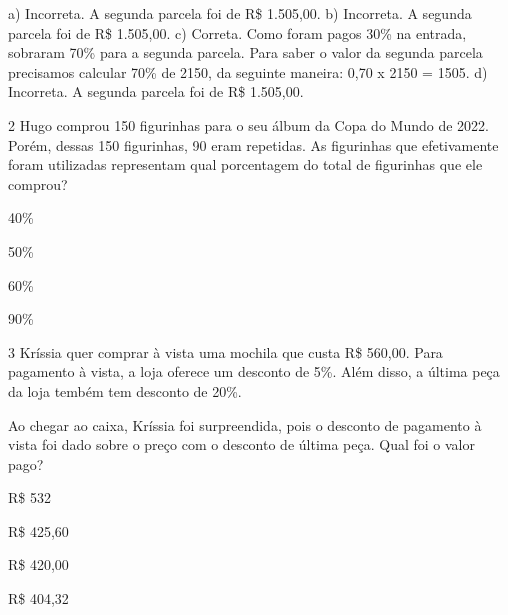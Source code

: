 \begin{escolha}
\begin{boxmedio}
\begin{boxmedio}
{\begin{boxpeq}
\begin{boxpeq}
{\begin{boxpeq}
\begin{boxmedio}
\begin{boxmedio}
\begin{boxpeq}
\begin{boxmedio}
\begin{boxpeq}
\begin{boxpeq}
\begin{boxpeq}
\begin{boxpeq}
{a) Incorreta. A segunda parcela foi de R\$ 1.505,00.
b) Incorreta. A segunda parcela foi de R\$ 1.505,00.
c) Correta. Como foram pagos 30\% na entrada, sobraram 70\% para a segunda 
parcela. Para saber o valor da segunda parcela precisamos calcular 70\% de
2150, da seguinte maneira: 0,70 x 2150 = 1505.
d) Incorreta. A segunda parcela foi de R\$ 1.505,00.}

\num{2} Hugo comprou 150 figurinhas para o seu álbum da Copa do Mundo de
2022. Porém, dessas 150 figurinhas, 90 eram repetidas. As figurinhas que
efetivamente foram utilizadas representam qual porcentagem do total de
figurinhas que ele comprou?

\begin{escolha}

\item 40\%
\item 50\%
\item 60\%
\item 90\%

\end{escolha}


\num{3} Kríssia quer comprar à vista uma mochila que custa R\$ 560,00. 
Para pagamento à vista, a loja oferece um desconto de 5\%. Além disso, 
a última peça da loja tembém tem desconto de 20\%.

Ao chegar ao caixa, Kríssia foi surpreendida, pois o desconto de
pagamento à vista foi dado sobre o preço com o desconto de
última peça. Qual foi o valor pago?

\begin{escolha}

\item R\$ 532
\item R\$ 425,60
\item R\$ 420,00
\item R\$ 404,32


\end{escolha}
\end{boxpeq}
\end{boxpeq}
\end{boxpeq}
\end{boxpeq}
\end{boxmedio}
\end{boxpeq}
\end{boxmedio}
\end{boxmedio}
\end{boxpeq}}
\end{boxpeq}
\end{boxpeq}}
\end{boxmedio}
\end{boxmedio}
\end{escolha}
